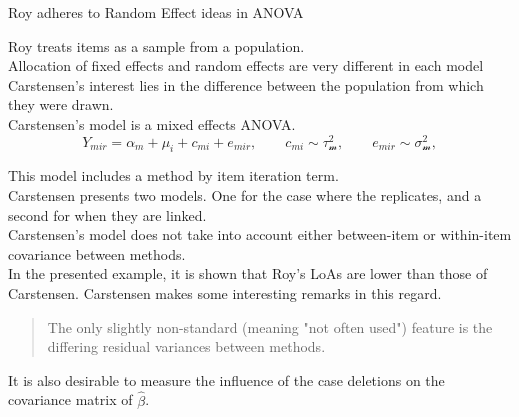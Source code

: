 \documentclass[12pt, a4paper]{report}
\theoremstyle{plain}
\theoremstyle{definition}
\theoremstyle{remark}
\begin{document}
Roy adheres to Random Effect ideas in ANOVA

Roy treats items as a sample from a population.\\

Allocation of fixed effects and random effects are very different in each model\\

Carstensen's interest lies in the difference between the population from which they were drawn.\\

Carstensen's model is a mixed effects ANOVA.\\

\[
Y_{mir}  =  \alpha_m + \mu_i + c_{mi} + e_{mir}, \qquad c_{mi} \sim \mathcal{\tau^2_m}, \qquad e_{mir} \sim \mathcal{\sigma^2_m},
\]

This model includes a method by item iteration term.\\

Carstensen presents two models. One for the case where the replicates, and a second for when they are linked.\\

Carstensen's model does not take into account either between-item or within-item covariance between methods.\\


In the presented example, it is shown that Roy's LoAs are lower than those of Carstensen.
Carstensen makes some interesting remarks in this regard.

\begin{quote}
	The only slightly non-standard (meaning "not often used") feature is the differing residual variances between methods.
\end{quote}





It is also desirable to measure the influence of the case deletions on the covariance matrix of $\hat{\beta}$.



\end{document}
